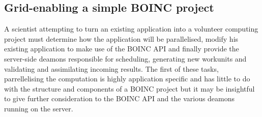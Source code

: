 \subsection{Grid-enabling a simple BOINC project} \label{Bgridenable}
A scientist attempting to turn an existing application into a volunteer computing project must  determine how the application will be parallelised, modify his existing application to make use of the BOINC API and finally provide the server-side deamons responsible for scheduling,  generating new workunits and validating and assimilating incoming results.
The first of these tasks, parrellelising the computation is highly application specific and has little to do with the structure and components of a BOINC project but it may be insightful to give further consideration to the BOINC API and the various deamons running on the server.
